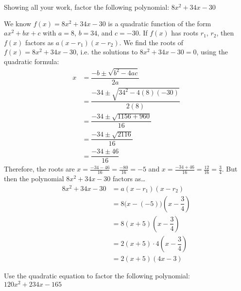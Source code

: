 \documentclass[11pt,letterpaper]{article}
\begin{document}
\newpage



 Showing all your work, factor the following polynomial: $8x^2 + 34x - 30$ \pspace

\sol We know $f(x)= 8x^2 + 34x - 30$ is a quadratic function of the form $ax^2 + bx + c$ with $a= 8$, $b= 34$, and $c= -30$. If $f(x)$ has roots $r_1$, $r_2$, then $f(x)$ factors as $a(x - r_1)(x - r_2)$. We find the roots of $f(x)= 8x^2 + 34x - 30$, i.e. the solutions to $8x^2 + 34x - 30= 0$, using the quadratic formula:
	\[
	\begin{aligned}
	x&= \dfrac{-b \pm \sqrt{b^2 - 4ac}}{2a} \\
	&= \dfrac{-34 \pm \sqrt{34^2 - 4(8)(-30)}}{2(8)} \\
	&= \dfrac{-34 \pm \sqrt{1156 + 960}}{16} \\
	&= \dfrac{-34 \pm \sqrt{2116}}{16} \\
	&= \dfrac{-34 \pm 46}{16}
	\end{aligned}
	\]
Therefore, the roots are $x= \frac{-34 - 46}{16}= \frac{-80}{16}= -5$ and $x= \frac{-34 + 46}{16}= \frac{12}{16}= \frac{3}{4}$. But then the polynomial $8x^2 + 34x - 30$ factors as\dots
	\[
	\begin{aligned}
	8x^2 + 34x - 30&= a(x - r_1)(x - r_2) \\
	&= 8 \big(x - (-5) \big) \left(x - \dfrac{3}{4} \right) \\
	&= 8(x + 5) \left(x - \dfrac{3}{4} \right) \\
	&= 2(x + 5) \cdot 4 \left(x - \dfrac{3}{4} \right) \\
	&= 2(x + 5)(4x - 3)
	\end{aligned}
	\]



\newpage



 Use the quadratic equation to factor the following polynomial: $120x^2 + 234x - 165$ \pspace
\end{document}
